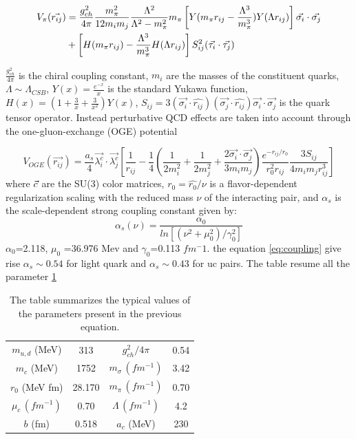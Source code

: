 \documentclass[12pt,a4paper]{book}
\begin{document}
	\begin{align}
		V_\pi(\vec{r_{ij}}) &= \frac{g_{ch}^2}{4\pi} \frac{m_\pi^2}{12 m_i m_j} \frac{\Lambda^2}{\Lambda^2 - m_\pi^2} m_\pi \left[ Y(m_\pi r_{ij} - \frac{\Lambda^3}{m_\pi^3}) Y(\Lambda r_{ij}) \right] \vec{\sigma_i} \cdot \vec{\sigma_j} \notag \\
		&+ \left[ H(m_\pi r_{ij}) - \frac{\Lambda^3}{m_\pi^3} H(\Lambda r_{ij}) \right] S_{ij}^2 (\vec{\tau_i} \cdot \vec{\tau_j})
		\label{eq:pi-potential}
	\end{align}
	
	
	$\frac{g_{ch}^2}{4\pi}$ is the chiral coupling constant, $m_i$ are the masses of the constituent quarks, $\Lambda \sim \Lambda_{CSB}$, $Y(x)= \frac{e^{-x}}{x}$ is the standard Yukawa function, $H(x)= (1 + \frac{3}{x} + \frac{3}{x^2}) Y(x)$, $S_{ij}=3(\vec{\sigma_i} \cdot \hat{r_{ij}}) (\vec{\sigma_j} \cdot \hat{r_{ij}}) \vec{\sigma_i} \cdot \vec{\sigma_j}$ is the quark tensor operator. Instead perturbative QCD effects are taken into account through the one-gluon-exchange (OGE) potential
	
	\begin{equation}
		V_{OGE}(\vec{r_{ij}}) = \frac{a_s}{4} \vec{\lambda_i^c} \cdot \vec{\lambda_j^c} \left[ \frac{1}{r_{ij}}- \frac{1}{4} \left(\frac{1}{2m_i^2} + \frac{1}{2m_j^2} + \frac{2 \vec{\sigma_i} \cdot \vec{\sigma_j}}{3 m_i m_j} \right) \frac{e^{-r_{ij}/r_0}}{r_0^2 r_{ij}} \frac{3 S_{ij}}{4m_i m_j r_{ij}^3} \right]
		\label{eq:one-gluon-exchange-potential}
	\end{equation}
	where $\vec{\label^c}$ are the SU(3) color matrices, $r_0= \hat{r_0}/\nu$ is a flavor-dependent regularization scaling	with the reduced mass $\nu$ of the interacting pair, and $\alpha_s$ is the scale-dependent strong coupling constant given by:
	\begin{equation}
		\alpha_s(\nu)= \frac{\alpha_0}{ln[(\nu^2+\mu_0^2)/\gamma_0^2]}
		\label{eq:coupling}
	\end{equation}
	$\alpha_0$=2.118, $\mu_0$ =36.976 Mev and $\gamma_0$=0.113 $fm^-1$. the  equation \ref{eq:coupling} give rise $\alpha_s \sim 0.54$ for light quark and $\alpha_s \sim 0.43$ for uc pairs. The table resume all the parameter \ref{tab:par-resume}
	
	\begin{table}[h]
		\centering
		\begin{tabular}{c c | c c}
			$m_{u,d}$ (MeV) & 313 & $g_{ch}^2 / 4\pi$ & 0.54 \\
			$m_{c}$ (MeV) & 1752 & $m_{\sigma} \, (fm^{-1})$ & 3.42 \\
			$\hat{r_0}$ (MeV fm) & 28.170 &  $m_{\pi} \, (fm^{-1})$ & 0.70 \\
			$\mu_c \, (fm^{-1})$ & 0.70 & $\Lambda \, (fm^{-1})$ & 4.2 \\
			$b$ (fm) & 0.518 & $a_c$ (MeV) & 230 \\
		\end{tabular}
		\caption{The table summarizes the typical values of the parameters present in the previous equation.}
		\label{tab:par-resume}
	\end{table}
	
\end{document}
